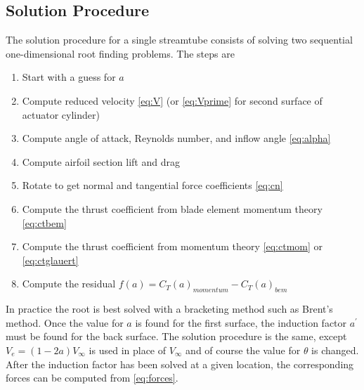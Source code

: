 \documentclass{article}
\begin{document}
\subsection{Solution Procedure}

The solution procedure for a single streamtube consists of solving two sequential one-dimensional root finding problems.  The steps are

\begin{enumerate}
\item Start with a guess for $a$
\item Compute reduced velocity \eqref{eq:V} (or \eqref{eq:Vprime} for second surface of actuator cylinder)
\item Compute angle of attack, Reynolds number, and inflow angle \eqref{eq:alpha}
\item Compute airfoil section lift and drag
\item Rotate to get normal and tangential force coefficients  \eqref{eq:cn}
\item Compute the thrust coefficient from blade element momentum theory \eqref{eq:ctbem}
\item Compute the thrust coefficient from momentum theory \eqref{eq:ctmom} or \eqref{eq:ctglauert}
\item Compute the residual $f(a) = C_T(a)_{momentum} - C_T(a)_{bem}$
\end{enumerate}

In practice the root is best solved with a bracketing method such as Brent's method.  Once the value for $a$ is found for the first surface, the induction factor $a^\prime$ must be found for the back surface.  The solution procedure is the same, except $V_e = (1-2a)V_\infty$ is used in place of $V_\infty$ and of course the value for $\theta$ is changed.  After the induction factor has been solved at a given location, the corresponding forces can be computed from \eqref{eq:forces}.
\end{document}
